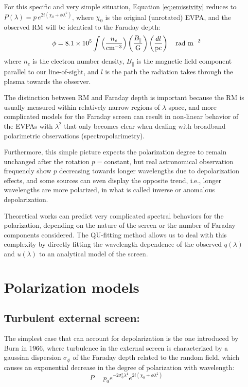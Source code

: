 For this specific and very simple situation, Equation \ref{eq:emissivity} reduces to $P(\lambda) = p\,e^{2i(\chi_0 + \phi\lambda^2)}$, where $\chi_0$ is the original (unrotated) EVPA, and the observed RM will be identical to the Faraday depth:
\begin{equation}\label{eq:depht}
    \displaystyle\phi = 8.1\times 10^{5}\int \left(\frac{n_e}{\text{cm}^{-3}}\right) \left(\frac{B_\parallel}{\text{G}}\right) \left(\frac{dl}{\text{pc}}\right) \quad\textnormal{rad m}^{-2}
\end{equation}
where $n_e$ is the electron number density, $B_\parallel$ is the magnetic field component parallel to our line-of-sight, and $l$ is the path the radiation takes through the plasma towards the observer.

The distinction between RM and Faraday depth is important because the RM is usually measured within relatively narrow regions of $\lambda$ space, and more complicated models for the Faraday screen can result in non-linear behavior of the EVPAs with $\lambda^2$ that only becomes clear when dealing with broadband polarimetric observations (spectropolarimetry).

Furthermore, this simple picture expects the polarization degree to remain unchanged after the rotation $p=$constant, but real astronomical observation frequencly show $p$ decreasing towards longer wavelengths due to depolarization effects, and some sources can even display the opposite trend, i.e., longer wavelengths are more polarized, in what is called inverse or anomalous depolarization.

Theoretical works can predict very complicated spectral behaviors for the polarization, depending on the nature of the screen or the number of Faraday components considered.
The QU-fitting method allows us to deal with this complexity by directly fitting the wavelength dependence of the observed $q(\lambda)$ and $u(\lambda)$ to an analytical model of the screen.
\\

\section{Polarization models}

\subsection{Turbulent external screen:}
The simplest case that can account for depolarization is the one introduced by Burn in 1966, where turbulence in the external screen is characterized by a gaussian dispersion $\sigma_\phi$ of the Faraday depth related to the random field, which causes an exponential decrease in the degree of polarization with wavelength:
\begin{equation}\label{eq:burn}
    \displaystyle P = p_0e^{-2\sigma_\phi^2\lambda^4}e^{2i(\chi_0+\phi\lambda^2)}
\end{equation}

